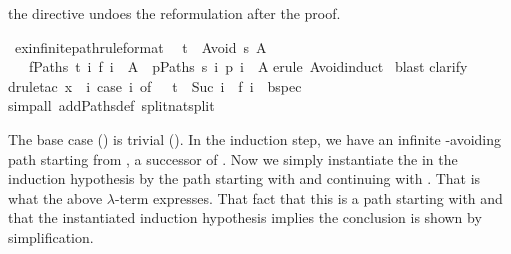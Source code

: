 \begin{isabellebody}
\begin{isamarkuptext}
the  directive undoes the reformulation after the proof.%
\end{isamarkuptext}%
\ ex{\isacharunderscore}infinite{\isacharunderscore}path{\isacharbrackleft}rule{\isacharunderscore}format{\isacharbrackright}{\isacharcolon}\isanewline
\ \ {\isachardoublequote}t\ {\isasymin}\ Avoid\ s\ A\ \ {\isasymLongrightarrow}\isanewline
\ \ \ {\isasymforall}f{\isasymin}Paths\ t{\isachardot}\ {\isacharparenleft}{\isasymforall}i{\isachardot}\ f\ i\ {\isasymnotin}\ A{\isacharparenright}\ {\isasymlongrightarrow}\ {\isacharparenleft}{\isasymexists}p{\isasymin}Paths\ s{\isachardot}\ {\isasymforall}i{\isachardot}\ p\ i\ {\isasymnotin}\ A{\isacharparenright}{\isachardoublequote}\isanewline
{}erule\ Avoid{\isachardot}induct{\isacharparenright}\isanewline
\ blast{\isacharparenright}\isanewline
{}clarify{\isacharparenright}\isanewline
{}drule{\isacharunderscore}tac\ x\ {\isacharequal}\ {\isachardoublequote}{\isasymlambda}i{\isachardot}\ case\ i\ of\ {}\ {\isasymRightarrow}\ t\ {\isacharbar}\ Suc\ i\ {\isasymRightarrow}\ f\ i{\isachardoublequote}\ \ bspec{\isacharparenright}\isanewline
{}simp{\isacharunderscore}all\ add{\isacharcolon}Paths{\isacharunderscore}def\ split{\isacharcolon}nat{\isachardot}split{\isacharparenright}\isanewline
{}%
\begin{isamarkuptext}%
\noindent
The base case () is trivial ().
In the induction step, we have an infinite -avoiding path 
starting from , a successor of . Now we simply instantiate
the  in the induction hypothesis by the path starting with
 and continuing with . That is what the above $\lambda$-term
expresses. That fact that this is a path starting with  and that
the instantiated induction hypothesis implies the conclusion is shown by
simplification.


\end{isamarkuptext}
\end{isabellebody}
